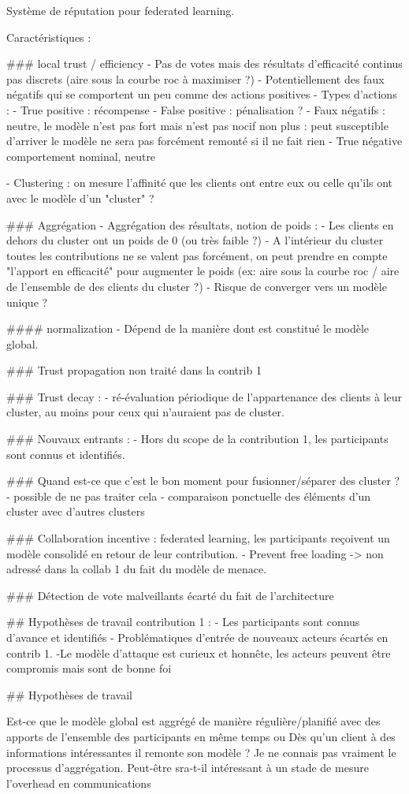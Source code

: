 Système de réputation pour federated learning. 


Caractéristiques : 

### local trust / efficiency 
- Pas de votes mais des résultats d'efficacité continus pas discrets (aire sous la courbe roc à maximiser ?)	
	- Potentiellement des faux négatifs qui se comportent un peu comme des actions positives 
	- Types d'actions : 
		- True positive : récompense
		- False positive : pénalisation ? 
		- Faux négatifs : neutre, le modèle n'est pas fort mais n'est pas nocif non plus : peut susceptible d'arriver le modèle ne sera pas forcément remonté si il ne fait rien 
		- True négative comportement nominal, neutre

- Clustering : on mesure l'affinité que les clients ont entre eux ou celle qu'ils ont avec le modèle d'un "cluster" ? 
	
		
### Aggrégation 
- Aggrégation des résultats, notion de poids : 
	- Les clients en dehors du cluster ont un poids de 0 (ou très faible ?)
	- A l'intérieur du cluster toutes les contributions ne se valent pas forcément, on peut prendre en compte "l'apport en efficacité" pour augmenter le poids (ex: aire sous la courbe roc / aire de l'ensemble de des clients du cluster ?)  
		- Risque de converger vers un modèle unique ?
  
#### normalization 
- Dépend de la manière dont est constitué le modèle global.


### Trust propagation 
	non traité dans la contrib 1
		
### Trust decay : 
	- ré-évaluation périodique de l'appartenance des clients à leur cluster, au moins pour ceux qui n'auraient pas de cluster. 

### Nouvaux entrants :
	- Hors du scope de la contribution 1, les participants sont connus et identifiés.
	
### Quand est-ce que c'est le bon moment pour fusionner/séparer des cluster ? 
	- possible de ne pas traiter cela 
	- comparaison ponctuelle des éléments d'un cluster avec d'autres clusters
	  
### Collaboration incentive 
: federated learning, les participants reçoivent un modèle consolidé en retour de leur contribution.
	- Prevent free loading
		-> non adressé dans la collab 1 du fait du modèle de menace. 

### Détection de vote malveillants 
écarté du fait de l'architecture
	
## Hypothèses de travail contribution 1 : 
	- Les participants sont connus d'avance et identifiés
		- Problématiques d'entrée de nouveaux acteurs écartés en contrib 1.
	-Le modèle d'attaque est curieux et honnête, les acteurs peuvent être compromis mais sont de bonne foi
 
## Hypothèses de travail 


Est-ce que le modèle global est aggrégé de manière régulière/planifié avec des apports de l'ensemble des participants en même temps ou 
Dès qu'un client à des informations intéressantes il remonte son modèle ? 
Je ne connais pas vraiment le processus d'aggrégation.   
Peut-être sra-t-il intéressant à un stade de mesure l'overhead en communications 

